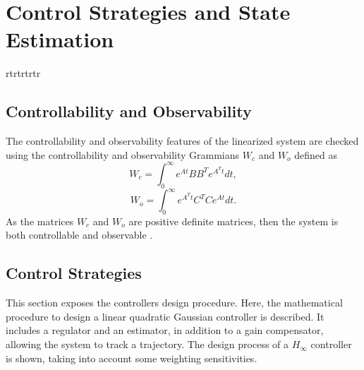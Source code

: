 \chapter{Control Strategies and State Estimation} \label{ch:controlandestimation}
rtrtrtrtr
\section{Controllability and Observability}
The controllability and observability features of the linearized system are checked using the controllability and observability Grammians $W_{c}$ and $W_{o}$ defined as
		\begin{equation}
		W_{c} = \int_{0}^{\infty}e^{At}BB^{T}e^{A^{T}t}dt,
		\end{equation}
		\begin{equation}
		W_{o} = \int_{0}^{\infty}e^{A^{T}t}C^{T}Ce^{At}dt.
		\end{equation}
As the matrices $W_{c}$ and $W_{o}$ are positive definite matrices, then the system is both controllable and observable \cite{Werner2012}.

\section{Control Strategies}
This section exposes the controllers design procedure. Here, the mathematical procedure to design a linear quadratic Gaussian controller is described. It includes a regulator and an estimator, in addition to a gain compensator, allowing the system to track a trajectory. The design process of a $H_{\infty}$ controller is shown, taking into account some weighting sensitivities.

